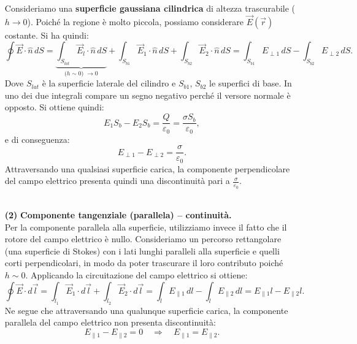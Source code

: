 \documentclass{book}
\begin{document}
\begin{itemize}
Consideriamo una \textbf{superficie gaussiana cilindrica} di altezza trascurabile ($h \to 0$). Poiché la regione è molto piccola, possiamo considerare $\vec{E}(\vec{r})$ costante. Si ha quindi:
$$
\oint \vec{E}\cdot \hat{n}\,dS 
= \underbrace{\int_{S_{lat}}\vec{E}_l\cdot \hat{n}\,dS}_{\text{($h \sim 0$) $\to 0$}} 
+ \int_{S_{b1}}\vec{E}_1\cdot \hat{n}\,dS 
+ \int_{S_{b2}}\vec{E}_2\cdot \hat{n}\,dS 
= \int_{S_{b1}}E_{\perp 1}\,dS - \int_{S_{b2}}E_{\perp 2}\,dS.
$$
Dove $S_{lat}$ è la superficie laterale del cilindro e $S_{b1}$, $S_{b2}$ le superfici di base. In uno dei due integrali compare un segno negativo perché il versore normale è opposto. Si ottiene quindi:
$$
E_1 S_b - E_2 S_b = \frac{Q}{\varepsilon_0} = \frac{\sigma S_b}{\varepsilon_0},
$$
e di conseguenza:
$$
E_{\perp 1} - E_{\perp 2} = \frac{\sigma}{\varepsilon_0}.
$$
Attraversando una qualsiasi superficie carica, la componente perpendicolare del campo elettrico presenta quindi una discontinuità pari a $\frac{\sigma}{\varepsilon_0}$.
\\
\\
\item[\textbf{(2)}] \textbf{Componente tangenziale (parallela) -- continuità.}\\
Per la componente parallela alla superficie, utilizziamo invece il fatto che il rotore del campo elettrico è nullo. 
Consideriamo un percorso rettangolare (una superficie di Stokes) con i lati lunghi paralleli alla superficie e quelli corti perpendicolari, in modo da poter trascurare il loro contributo poiché $h \sim 0$. 
Applicando la circuitazione del campo elettrico si ottiene:
$$
\oint \vec{E}\cdot d\vec{l} = 
\int_{l_1}\vec{E}_1\cdot d\vec{l} + \int_{l_2}\vec{E}_2\cdot d\vec{l} 
= \int_{l}E_{\parallel 1}\,dl - \int_{l}E_{\parallel 2}\,dl
= E_{\parallel 1}l - E_{\parallel 2}l.
$$
Ne segue che attraversando una qualunque superficie carica, la componente parallela del campo elettrico non presenta discontinuità:
$$
E_{\parallel 1} - E_{\parallel 2} = 0 \quad \Rightarrow \quad E_{\parallel 1} = E_{\parallel 2}.
$$
\
\end{itemize}
\end{document}
